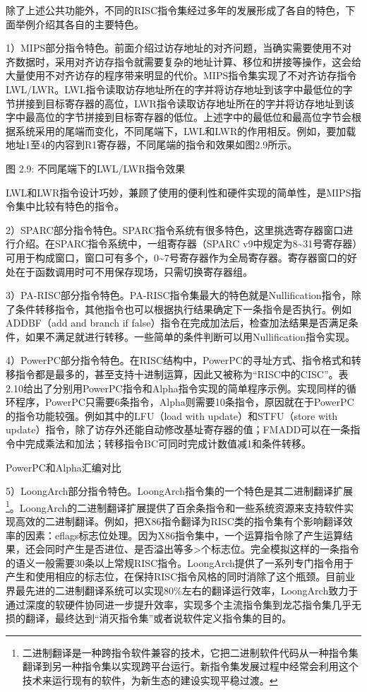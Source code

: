 \documentclass[]{ctexbook}
\begin{document}
除了上述公共功能外，不同的RISC指令集经过多年的发展形成了各自的特色，下面举例介绍其各自的主要特色。

1）MIPS部分指令特色。前面介绍过访存地址的对齐问题，当确实需要使用不对齐数据时，采用对齐访存指令就需要复杂的地址计算、移位和拼接等操作，这会给大量使用不对齐访存的程序带来明显的代价。MIPS指令集实现了不对齐访存指令LWL/LWR。LWL指令读取访存地址所在的字并将访存地址到该字中最低位的字节拼接到目标寄存器的高位，LWR指令读取访存地址所在的字并将访存地址到该字中最高位的字节拼接到目标寄存器的低位。上述字中的最低位和最高位字节会根据系统采用的尾端而变化，不同尾端下，LWL和LWR的作用相反。例如，要加载地址1至4的内容到R1寄存器，不同尾端的指令和效果如图2.9所示。

图 2.9: 不同尾端下的LWL/LWR指令效果

LWL和LWR指令设计巧妙，兼顾了使用的便利性和硬件实现的简单性，是MIPS指令集中比较有特色的指令。

2）SPARC部分指令特色。SPARC指令系统有很多特色，这里挑选寄存器窗口进行介绍。在SPARC指令系统中，一组寄存器（SPARC v9中规定为8\textasciitilde31号寄存器）可用于构成窗口，窗口可有多个，0\textasciitilde7号寄存器作为全局寄存器。寄存器窗口的好处在于函数调用时可不用保存现场，只需切换寄存器组。

3）PA-RISC部分指令特色。PA-RISC指令集最大的特色就是Nullification指令，除了条件转移指令，其他指令也可以根据执行结果确定下一条指令是否执行。例如ADDBF（add and branch if false）指令在完成加法后，检查加法结果是否满足条件，如果不满足就进行转移。一些简单的条件判断可以用Nullification指令实现。

4）PowerPC部分指令特色。在RISC结构中，PowerPC的寻址方式、指令格式和转移指令都是最多的，甚至支持十进制运算，因此又被称为``RISC中的CISC''。表2.10给出了分别用PowerPC指令和Alpha指令实现的简单程序示例。实现同样的循环程序，PowerPC只需要6条指令，Alpha则需要10条指令，原因就在于PowerPC的指令功能较强。例如其中的LFU（load with update）和STFU（store with update）指令，除了访存外还能自动修改基址寄存器的值；FMADD可以在一条指令中完成乘法和加法；转移指令BC可同时完成计数值减1和条件转移。

\label{tab:ppc-vs-alpha}PowerPC和Alpha汇编对比

5）LoongArch部分指令特色。LoongArch指令集的一个特色是其二进制翻译扩展\footnote{二进制翻译是一种跨指令软件兼容的技术，它把二进制软件代码从一种指令集翻译到另一种指令集以实现跨平台运行。新指令集发展过程中经常会利用这个技术来运行现有的软件，为新生态的建设实现平稳过渡。}。LoongArch的二进制翻译扩展提供了百余条指令和一些系统资源来支持软件实现高效的二进制翻译。例如，把X86指令翻译为RISC类的指令集有个影响翻译效率的因素：eflags标志位处理。因为X86指令集中，一个运算指令除了产生运算结果，还会同时产生是否进位、是否溢出等多\textgreater 个标志位。完全模拟这样的一条指令的语义一般需要30条以上常规RISC指令。LoongArch提供了一系列专门指令用于产生和使用相应的标志位，在保持RISC指令风格的同时消除了这个瓶颈。目前业界最先进的二进制翻译系统可以实现80\%左右的翻译运行效率，LoongArch致力于通过深度的软硬件协同进一步提升效率，实现多个主流指令集到龙芯指令集几乎无损的翻译，最终达到``消灭指令集''或者说软件定义指令集的目的。
\end{document}
